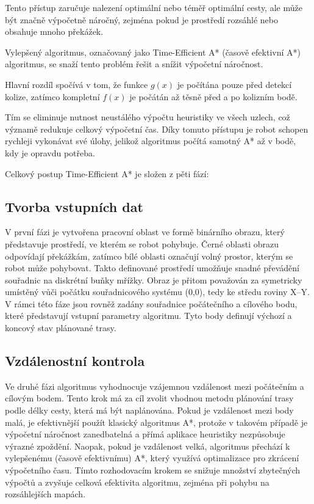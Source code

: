 \documentclass[10pt, a4paper]{article}
\begin{document}
Tento přístup zaručuje nalezení optimální nebo téměř optimální cesty, ale může být značně výpočetně náročný, zejména pokud je prostředí rozsáhlé nebo obsahuje mnoho překážek.

Vylepšený algoritmus, označovaný jako Time-Efficient A* (časově efektivní A*) algoritmus, se snaží tento problém řešit a snížit výpočetní náročnost.

Hlavní rozdíl spočívá v tom, že funkce $g(x)$ je počítána pouze před detekcí kolize, zatímco kompletní $f(x)$ je počátán až těsně před a po kolizním bodě.

Tím se eliminuje nutnost neustálého výpočtu heuristiky ve všech uzlech, což významě redukuje celkový výpočetní čas.
Díky tomuto přístupu je robot schopen rychleji vykonávat své úlohy, jelikož algoritmus počítá samotný \newline A* až v bodě, kdy je opravdu potřeba.

Celkový postup Time-Efficient A* je složen z pěti fází:

\subsection{Tvorba vstupních dat}
V první fázi je vytvořena pracovní oblast ve formě binárního obrazu, který představuje prostředí, ve kterém se robot pohybuje.
Černé oblasti obrazu odpovídají překážkám, zatímco bílé oblasti označují volný prostor, kterým se robot může pohybovat.
Takto definované prostředí umožňuje snadné převádění souřadnic \newline na diskrétní buňky mřížky.
Obraz je přitom považován za symetricky umístěný vůči počátku souřadnicového systému (0,0), tedy ke středu roviny X–Y.
V rámci této fáze jsou rovněž zadány souřadnice počátečního a cílového bodu, které představují vstupní parametry algoritmu.
Tyto body definují výchozí a koncový stav plánované trasy.

\subsection{Vzdálenostní kontrola}
Ve druhé fázi algoritmus vyhodnocuje vzájemnou vzdálenost mezi počátečním a cílovým bodem.
Tento krok má za cíl zvolit vhodnou metodu plánování trasy podle délky cesty, která má být naplánována.
Pokud je vzdálenost mezi body malá, je efektivnější použít klasický algoritmus A*, protože v takovém případě je výpočetní náročnost zanedbatelná a přímá aplikace heuristiky nezpůsobuje výrazné zpoždění.
Naopak, pokud je vzdálenost velká, algoritmus přechází \newline k vylepšenému (časově efektivnímu) A*, který využívá optimalizace pro zkrácení výpočetního času.
Tímto rozhodovacím krokem se snižuje množství zbytečných výpočtů a zvyšuje celková efektivita algoritmu, zejména při pohybu na rozsáhlejších mapách.
\end{document}
